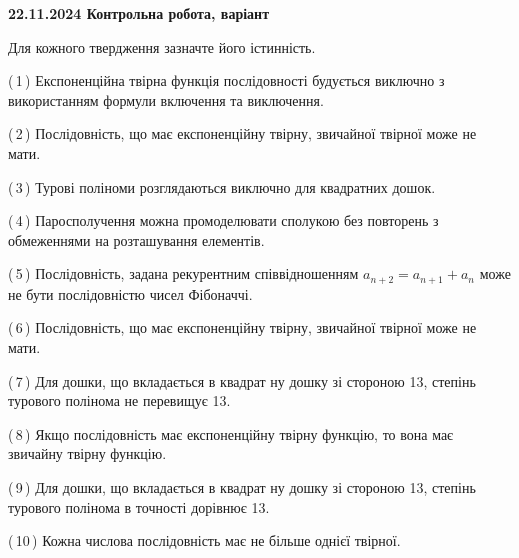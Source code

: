 \documentclass[12pt, ukrainian]{article}
\begin{document}
\begin {large}
\begin {large}
\begin {large}
\begin {large}
\begin {large}
\begin {large}
\begin {large}
\begin {large}
\begin {large}
\begin {large}
\begin {large}
\begin {large}
\begin {large}
\begin {large}
\begin {large}
\begin {large}
\begin {large}
\begin {large}
\begin {large}
\begin {large}
\begin {large}
\begin {large}
\begin {large}
\begin {large}
\begin {large}
\begin {large}
\begin {large}
{\vspace{5mm}
}
\newpage

\begin {large}

\textbf{22.11.2024 Контрольна робота, варіант  }\par


{
Для кожного твердження зазначте його істинність.\par

\vspace{2mm}

(\,1\,) Експоненційна твірна функція послідовності будується виключно з використанням формули включення та виключення.%



(\,2\,) Послідовність, що має експоненційну твірну, звичайної твірної може не мати.%



(\,3\,) Турові поліноми розглядаються виключно для квадратних дошок.%



(\,4\,) Паросполучення можна промоделювати сполукою без повторень з обмеженнями на розташування елементів.%



(\,5\,) Послідовність, задана рекурентним співвідношенням $a_{n+2}=a_{n+1}+a_{n}$ може не бути послідовністю чисел Фібоначчі.%



(\,6\,) Послідовність, що має експоненційну твірну, звичайної твірної може не мати.%



(\,7\,) Для дошки, що вкладається в квадрат ну дошку зі стороною 13, степінь турового полінома не перевищує 13.%



(\,8\,) Якщо послідовність має експоненційну твірну функцію, то вона має звичайну твірну функцію.%



(\,9\,) Для дошки, що вкладається в квадрат ну дошку зі стороною 13, степінь турового полінома в точності дорівнює 13.%



(\,10\,) Кожна числова послідовність має не більше однієї твірної.%




\vspace{5mm}
}
\newpage


\end{large}
\end{large}
\end{large}
\end{large}
\end{large}
\end{large}
\end{large}
\end{large}
\end{large}
\end{large}
\end{large}
\end{large}
\end{large}
\end{large}
\end{large}
\end{large}
\end{large}
\end{large}
\end{large}
\end{large}
\end{large}
\end{large}
\end{large}
\end{large}
\end{large}
\end{large}
\end{large}
\end{large}
\end{document}
